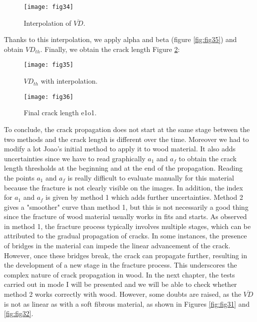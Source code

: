 \begin{figure}[htp]
	\centering
	\texttt{[image: fig34]}
	\caption{Interpolation of $\overline{VD}$.}
	\label{fig:fig34}
\end{figure}

Thanks to this interpolation, we apply alpha and beta (figure \ref{fig:fig35}) and obtain $VD_{th}$. Finally, we obtain the crack length Figure \ref{fig:fig36}:

\begin{figure}[h]
	\begin{minipage}[c]{.46\linewidth}
		\centering
		\texttt{[image: fig35]}
		\caption{$VD_{th}$ with interpolation.}
		\label{fig:fig35}
	\end{minipage}
	\hfill%
	\begin{minipage}[c]{.46\linewidth}
		\centering
		\texttt{[image: fig36]}
		\caption{Final crack length e1o1.}
		\label{fig:fig36}
	\end{minipage}
\end{figure}

To conclude, the crack propagation does not start at the same stage between the two methods and the crack length is different over the time. Moreover we had to modify a lot Joao's initial method to apply it to wood material. It also adds uncertainties since we have to read graphically $a_1$ and $a_f$ to obtain the crack length thresholds at the beginning and at the end of the propagation. Reading the points $a_1$ and $a_f$ is really difficult to evaluate manually for this material because the fracture is not clearly visible on the images. In addition, the index for $a_1$ and $a_f$ is given by method 1 which adds further uncertainties. Method 2 gives a "smoother" curve than method 1, but this is not necessarily a good thing since the fracture of wood material usually works in fits and starts.
As observed in method 1, the fracture process typically involves multiple stages, which can be attributed to the gradual propagation of cracks. In some instances, the presence of bridges in the material can impede the linear advancement of the crack. However, once these bridges break, the crack can propagate further, resulting in the development of a new stage in the fracture process. This underscores the complex nature of crack propagation in wood. In the next chapter, the tests carried out in mode I will be presented and we will be able to check whether method 2 works correctly with wood. However, some doubts are raised, as the $\overline{VD}$ is not as linear as with a soft fibrous material, as shown in Figures \ref{fig:fig31} and \ref{fig:fig32}.

